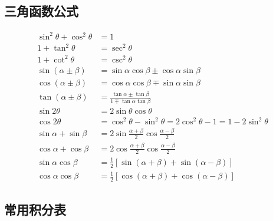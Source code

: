 \documentclass[12pt]{article}
\begin{document}
\subsection{三角函数公式}

\begin{align}
\sin^2\theta + \cos^2\theta &= 1 \\
1 + \tan^2\theta &= \sec^2\theta \\
1 + \cot^2\theta &= \csc^2\theta \\
\sin(\alpha \pm \beta) &= \sin\alpha\cos\beta \pm \cos\alpha\sin\beta \\
\cos(\alpha \pm \beta) &= \cos\alpha\cos\beta \mp \sin\alpha\sin\beta \\
\tan(\alpha \pm \beta) &= \frac{\tan\alpha \pm \tan\beta}{1 \mp \tan\alpha\tan\beta} \\
\sin 2\theta &= 2\sin\theta\cos\theta \\
\cos 2\theta &= \cos^2\theta - \sin^2\theta = 2\cos^2\theta - 1 = 1 - 2\sin^2\theta \\
\sin\alpha + \sin\beta &= 2\sin\frac{\alpha+\beta}{2}\cos\frac{\alpha-\beta}{2} \\
\cos\alpha + \cos\beta &= 2\cos\frac{\alpha+\beta}{2}\cos\frac{\alpha-\beta}{2} \\
\sin\alpha\cos\beta &= \frac{1}{2}[\sin(\alpha+\beta) + \sin(\alpha-\beta)] \\
\cos\alpha\cos\beta &= \frac{1}{2}[\cos(\alpha+\beta) + \cos(\alpha-\beta)]
\end{align}

\subsection{常用积分表}
\end{document}

